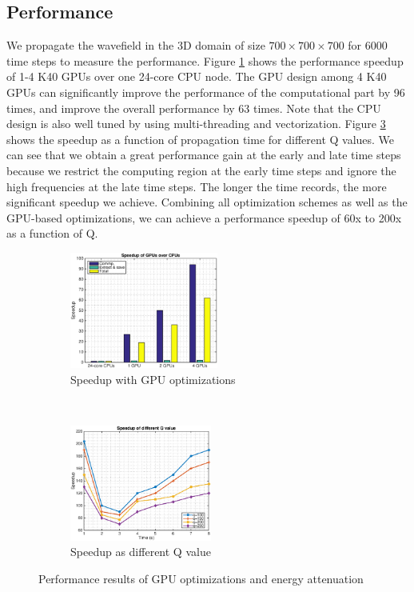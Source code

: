 \documentclass{paris17}
\begin{document}
\subsection{Performance}

We propagate the wavefield in the 3D domain of size $700\times700\times700$ for 6000 time steps to measure the performance. Figure \ref{fig:gpu-speedup} shows the performance speedup of 1-4 K40 GPUs over one 24-core CPU node. The GPU design among 4 K40 GPUs can significantly improve the performance of the computational part by 96 times, and improve the overall performance by 63 times. Note that the CPU design is also well tuned by using multi-threading and vectorization. Figure \ref{fig:q-speedup} shows the speedup as a function of propagation time for different Q values. We can see that we obtain a great performance gain at the early and late time steps because we restrict the computing region at the early time steps and ignore the high frequencies at the late time steps. The longer the time records, the more significant speedup we achieve. Combining all optimization schemes as well as the GPU-based optimizations, we can achieve a performance speedup of 60x to 200x as a function of Q.

\begin{figure}[h]
    \centering
    \begin{subfigure}[b]{0.4\textwidth}
        \centering
        \includegraphics[height=1.5in]{./fig/speedup.eps}
        \caption{Speedup with GPU optimizations}
        \label{fig:gpu-speedup}
    \end{subfigure}%
    ~
    \begin{subfigure}[b]{0.4\textwidth}
        \centering
        \includegraphics[height=1.5in]{./fig/speedup_q.eps}
        \caption{Speedup as different Q value}
        \label{fig:q-speedup}
    \end{subfigure}
    \caption{Performance results of GPU optimizations and energy attenuation}
\end{figure}
\end{document}
